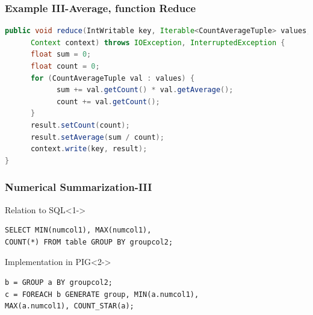 \documentclass[xcolor=dvipsnames,dvip,notes=show,table]{beamer}
\begin{document}
\begin{frame}[fragile]
  \frametitle{Example III-Average, function Reduce}

\begin{lstlisting}[language=Java]
public void reduce(IntWritable key, Iterable<CountAverageTuple> values,
      Context context) throws IOException, InterruptedException {
      float sum = 0;
      float count = 0;
      for (CountAverageTuple val : values) {
            sum += val.getCount() * val.getAverage();
            count += val.getCount();
      }
      result.setCount(count);
      result.setAverage(sum / count);
      context.write(key, result);
}
\end{lstlisting}

\end{frame}



\begin{frame}[fragile]
  \frametitle{Numerical Summarization-III}
  \begin{block}{Relation to SQL}<1->
  
  \begin{lstlisting}
SELECT MIN(numcol1), MAX(numcol1),
COUNT(*) FROM table GROUP BY groupcol2;
\end{lstlisting}
\end{block}

\begin{exampleblock}{Implementation in PIG}<2->

\begin{lstlisting}
b = GROUP a BY groupcol2;
c = FOREACH b GENERATE group, MIN(a.numcol1),
MAX(a.numcol1), COUNT_STAR(a);
\end{lstlisting}

\end{exampleblock}

\end{frame}


\end{document}
